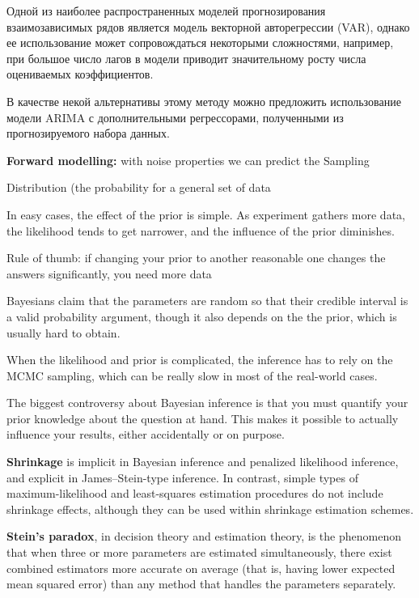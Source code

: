 \documentclass[12pt,a4paper, oneside]{extreport}
\begin{document}
Одной из наиболее распространенных моделей прогнозирования взаимозависимых рядов является модель векторной авторегрессии (VAR), однако ее использование может сопровождаться некоторыми сложностями, например, при большое число лагов в модели приводит значительному росту числа оцениваемых коэффициентов.  

В качестве некой альтернативы этому методу можно предложить использование модели ARIMA с дополнительными регрессорами, полученными из прогнозируемого набора данных. 


\textbf{Forward	modelling:	}   with
noise	
properties	
we	
can	 predict	
the	Sampling	

Distribution
(the probability	
for	
a	
general	
set	
of	
data


In	
easy	
cases,	
the	
effect	
of	
the	
prior	
is	
simple. As	
experiment	
gathers	
more	
data,	
the	
likelihood	
tends	
to	
get	
narrower,	
and	
the	
influence	
of	
the	
prior	
diminishes.	


Rule	
of	
thumb:	
if	
changing	
your	
prior	
to	
another	
reasonable	
one	
changes	
the	
answers	
significantly,	
you	
need	
more	
data	

Bayesians claim that the parameters are random so that their credible interval is a valid probability argument, though it also depends on the  the prior, which is usually hard to obtain.

 When the likelihood and prior is complicated, the inference has to rely on the MCMC sampling, which can be really slow in most of the real-world cases.

 The biggest controversy about Bayesian inference is that you must quantify your prior knowledge about the question at hand. This makes it possible to actually influence your results, either accidentally or on purpose. 	


\textbf{Shrinkage} is implicit in Bayesian inference and penalized likelihood inference, and explicit in James–Stein-type inference. In contrast, simple types of maximum-likelihood and least-squares estimation procedures do not include shrinkage effects, although they can be used within shrinkage estimation schemes.


\textbf{Stein's  paradox}, in decision theory and estimation theory, is the phenomenon that when three or more parameters are estimated simultaneously, there exist combined estimators more accurate on average (that is, having lower expected mean squared error) than any method that handles the parameters separately. 
\end{document}
